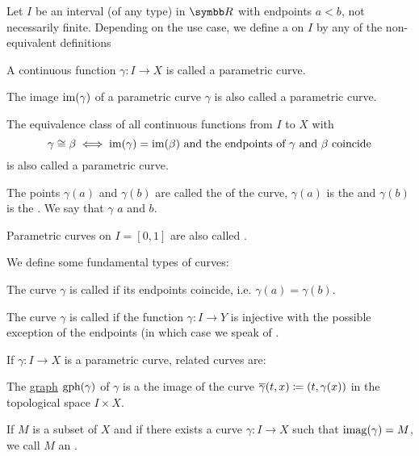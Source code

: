 \begin{definition}\label{def:parametric_curve}
  Let \( I \) be an interval (of any type) in \( \BR \) with endpoints \( a < b \), not necessarily finite. Depending on the use case, we define a  on \( I \) by any of the non-equivalent definitions

  \begin{DefEnum}
     A continuous function \( \gamma: I \to X \) is called a parametric curve.

     The image \( \operatorname{im}(\gamma) \) of a parametric curve \( \gamma \) is also called a parametric curve.

     The equivalence class of all continuous functions from \( I \) to \( X \) with
    \begin{equation*}
      \gamma \cong \beta \iff \operatorname{im}(\gamma) = \operatorname{im}(\beta) \text{ and the endpoints of } \gamma \text{ and } \beta \text{ coincide}
    \end{equation*}
    is also called a parametric curve.
  \end{DefEnum}

  The points \( \gamma(a) \) and \( \gamma(b) \) are called the  of the curve, \( \gamma(a) \) is the  and \( \gamma(b) \) is the . We say that \( \gamma \)  \( a \) and \( b \).

  Parametric curves on \( I = [0, 1] \) are also called .

  We define some fundamental types of curves:
  \begin{DefEnum}
     The curve \( \gamma \) is called  if its endpoints coincide, i.e. \( \gamma(a) = \gamma(b) \).

     The curve \( \gamma \) is called  if the function \( \gamma: I \to Y \) is injective with the possible exception of the endpoints (in which case we speak of .
  \end{DefEnum}

  If \( \gamma: I \to X \) is a parametric curve, related curves are:
  \begin{DefEnum}
    The \hyperref[def:function/graph]{graph} \( \operatorname{gph}(\gamma) \) of \( \gamma \) is a the image of the curve \( \overline{\gamma}(t, x) \coloneqq (t, \gamma(x)) \) in the topological space \( I \times X \).

    If \( M \) is a subset of \( X \) and if there exists a curve \( \gamma: I \to X \) such that \( \operatorname{imag}(\gamma) = M \), we call \( M \) an .
  \end{DefEnum}
\end{definition}

